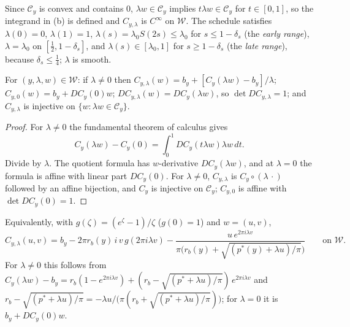 Since $\mathcal C_y$ is convex and contains $0$, $\lambda w\in\mathcal C_y$ implies $t\lambda w\in\mathcal C_y$ for $t\in[0,1]$,
so the integrand in (b) is defined and $C_{y,\lambda}$ is $C^\infty$ on $\mathcal W$. The schedule satisfies
$\lambda(0)=0$, $\lambda(1)=1$, $\lambda(s)=\lambda_0S(2s)\le\lambda_0$ for $s\le1-\delta_s$ (the \emph{early range}),
$\lambda=\lambda_0$ on $[\frac12,1-\delta_s]$, and $\lambda(s)\in[\lambda_0,1]$ for $s\ge1-\delta_s$ (the \emph{late range}),
because $\delta_s\le\frac14$; $\lambda$ is smooth.

\begin{lemma}\label{lem:pln-chart-lambda}
For $(y,\lambda,w)\in\mathcal W$: if $\lambda\ne0$ then $C_{y,\lambda}(w)=b_y+[C_y(\lambda w)-b_y]/\lambda$; $C_{y,0}(w)=b_y+DC_y(0)w$;
$DC_{y,\lambda}(w)=DC_y(\lambda w)$, so $\det DC_{y,\lambda}=1$; and $C_{y,\lambda}$ is injective on
$\{w:\lambda w\in\mathcal C_y\}$.
\end{lemma}

\begin{proof}
For $\lambda\ne0$ the fundamental theorem of calculus gives
\[
 C_y(\lambda w)-C_y(0)=\int_0^1DC_y(t\lambda w)\lambda w\,dt.
\]
Divide by $\lambda$. The quotient formula has $w$-derivative $DC_y(\lambda w)$, and at $\lambda=0$ the formula is affine
with linear part $DC_y(0)$. For $\lambda\ne0$, $C_{y,\lambda}$ is $C_y\circ(\lambda\,\cdot)$ followed by an affine bijection,
and $C_y$ is injective on $\mathcal C_y$; $C_{y,0}$ is affine with $\det DC_y(0)=1$.
\end{proof}

Equivalently, with $g(\zeta)=(e^\zeta-1)/\zeta$ ($g(0)=1$) and $w=(u,v)$,
\[
 C_{y,\lambda}(u,v)=b_y-2\pi r_b(y)\,i\,v\,g(2\pi i\lambda v)-\frac{u\,e^{2\pi i\lambda v}}{\pi\bigl(r_b(y)+\sqrt{(p^*(y)+\lambda u)/\pi}\bigr)}
 \qquad\text{on }\mathcal W .
\]
For $\lambda\ne0$ this follows from $C_y(\lambda w)-b_y=r_b(1-e^{2\pi i\lambda v})+(r_b-\sqrt{(p^*+\lambda u)/\pi})\,e^{2\pi i\lambda v}$
and $r_b-\sqrt{(p^*+\lambda u)/\pi}=-\lambda u/\bigl(\pi(r_b+\sqrt{(p^*+\lambda u)/\pi})\bigr)$; for $\lambda=0$ it is
$b_y+DC_y(0)w$.

